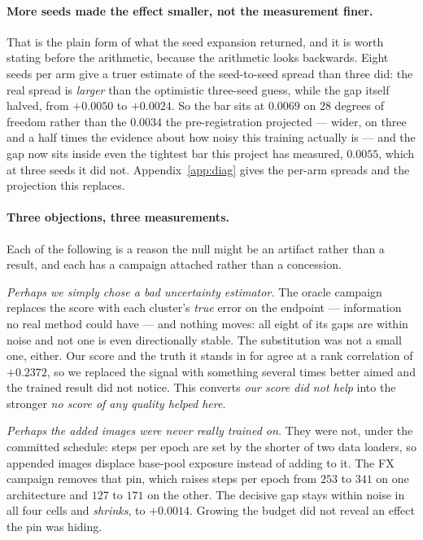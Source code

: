 \documentclass{article} %
\begin{document}
\paragraph{More seeds made the effect smaller, not the measurement finer.} That is the plain form of
what the seed expansion returned, and it is worth stating before the arithmetic, because the
arithmetic looks backwards. Eight seeds per arm give a truer estimate of the seed-to-seed spread
than three did: the real spread is \emph{larger} than the optimistic three-seed guess, while the gap
itself halved, from $+0.0050$ to $+0.0024$. So the bar sits at $0.0069$ on $28$ degrees of freedom
rather than the $0.0034$ the pre-registration projected --- wider, on three and a half times the
evidence about how noisy this training actually is --- and the gap now sits inside even the
tightest bar this project has measured, $0.0055$, which at three seeds it did not.
Appendix~\ref{app:diag} gives the per-arm spreads and the projection this replaces.

\paragraph{Three objections, three measurements.} Each of the following is a reason the null might
be an artifact rather than a result, and each has a campaign attached rather than a concession.

\emph{Perhaps we simply chose a bad uncertainty estimator.} The oracle campaign replaces the score
with each cluster's \emph{true} error on the endpoint --- information no real method could have ---
and nothing moves: all eight of its gaps are within noise and not one is even directionally stable.
The substitution was not a small one, either. Our score and the truth it stands in for agree at a
rank correlation of $+0.2372$, so we replaced the signal with something several times better aimed
and the trained result did not notice. This converts \emph{our score did not help} into the stronger
\emph{no score of any quality helped here}.

\emph{Perhaps the added images were never really trained on.} They were not, under the committed
schedule: steps per epoch are set by the shorter of two data loaders, so appended images displace
base-pool exposure instead of adding to it. The FX campaign removes that pin, which raises steps per
epoch from $253$ to $341$ on one architecture and $127$ to $171$ on the other. The decisive gap
stays within noise in all four cells and \emph{shrinks}, to $+0.0014$. Growing the budget did not
reveal an effect the pin was hiding.
\end{document}
